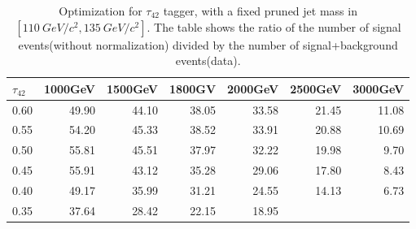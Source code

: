 \begin{table}[htbp]
\begin{tabular}{|r|r|r|r|r|r|r|}
\hline
\multicolumn{1}{|l|}{$\tau_{42}$} & \multicolumn{1}{l|}{1000GeV} & \multicolumn{1}{l|}{1500GeV} & \multicolumn{1}{l|}{1800GV} & \multicolumn{1}{l|}{2000GeV} & \multicolumn{1}{l|}{2500GeV} & \multicolumn{1}{l|}{3000GeV} \\ \hline
0.60 & 49.90 & 44.10 & 38.05 & 33.58 & 21.45 & 11.08 \\ \hline
0.55 & 54.20 & 45.33 & 38.52 & 33.91 & 20.88 & 10.69 \\ \hline
0.50 & 55.81 & 45.51 & 37.97 & 32.22 & 19.98 & 9.70 \\ \hline
0.45 & 55.91 & 43.12 & 35.28 & 29.06 & 17.80 & 8.43 \\ \hline
0.40 & 49.17 & 35.99 & 31.21 & 24.55 & 14.13 & 6.73 \\ \hline
0.35 & 37.64 & 28.42 & 22.15 & 18.95 & \multicolumn{1}{l|}{} & \multicolumn{1}{l|}{} \\ \hline
\end{tabular}
\caption{Optimization for $\tau_{42}$ tagger, with a fixed pruned jet 
  mass in $[110~GeV/c^2, 135~GeV/c^2]$.  The table shows the ratio of 
  the number of signal events(without normalization) divided by the number of signal+background
  events(data).}
\label{table:tau42Opti}
\end{table}

\fi



\clearpage

